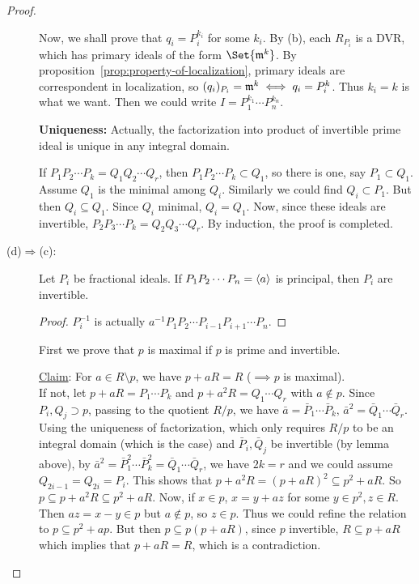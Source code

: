 \begin{theorem}
\begin{proof}
\begin{description}
        Now, we shall prove that $q_i = P_i^{k_i}$ for some $k_i$.
        By (b), each $R_{P_i}$ is a DVR, which has primary ideals
        of the form $\Set{\mf^k}$. By proposition~\ref{prop:property-of-localization},
        primary ideals are correspondent in localization,
        so $(q_i)_{P_i} = \mathfrak{m}^k \iff q_i = P_i^k$. Thus $k_i = k$
        is what we want. Then we could write $I = P_1^{k_1} \dotsm P_n^{k_n}$.

        {\bf Uniqueness:}
        Actually, the factorization into product of invertible
        prime ideal is unique in any integral domain.

        If $P_1 P_2 \dotsm P_k = Q_1 Q_2 \dotsm Q_r$,
        then $P_1 P_2 \dotsm P_k \subset Q_1$, so there is one,
        say $P_1 \subset Q_1$. Assume $Q_1$ is the minimal among $Q_i$.
        Similarly we could find $Q_i \subset P_1$.
        But then $Q_i \subseteq Q_1$. Since $Q_i$ minimal, $Q_i = Q_1$.
        Now, since these ideals are invertible,
        $P_2 P_3 \dotsm P_k = Q_2 Q_3 \dotsm Q_r$. By induction, the proof is completed.
      \item[\rm (d)$\Rightarrow$(c):]
        \begin{lemma}
          Let $P_i$ be fractional ideals. If $P_1 P_2 \dotsm P_n = \langle a\rangle$
          is principal, then $P_i$ are invertible.

          \begin{proof}
            $P_i^{-1}$ is actually $a^{-1} P_1 P_2 \dotsm P_{i-1} P_{i+1} \dotsm P_n$.
          \end{proof}
        \end{lemma}
        First we prove that $p$ is maximal if $p$ is prime and invertible.

        \underline{Claim}: For $a \in R \setminus p$, we have $p+ aR = R$
        ($\implies p$ is maximal). \\
        If not, let $p + aR = P_1 \dotsm P_k$ and $p + a^2 R = Q_1 \dotsm Q_r$
        with $a \notin p$.
        Since $P_i, Q_j \supset p$, passing to the quotient $R/p$, we have
        $\bar{a} = \bar P_1 \dotsm \bar P_k, \, \bar{a}^2 = \bar Q_1 \dotsm \bar Q_r$.
        Using the uniqueness of factorization, which only requires $R/p$
        to be an integral domain (which is the case) and $\bar P_i, \bar Q_j$
        be invertible (by lemma above),
        by $\bar{a}^2 = \bar P_1^2 \dotsm \bar P_k^2 = \bar Q_1 \dotsm \bar Q_r$,
        we have $2k = r$ and we could assume $Q_{2i-1} = Q_{2i} = P_i$.
        This shows that $p + a^2 R = (p + aR)^2 \subseteq p^2 + aR$.
        So $p \subseteq p + a^2 R \subseteq p^2 + aR$. Now, if $x \in p$,
        $x = y + az$ for some $y \in p^2, z \in R$. Then $az = x - y \in p$
        but $a \notin p$, so $z \in p$. Thus we could
        refine the relation to $p \subseteq p^2 + ap$.
        But then $p \subseteq p (p + aR)$, since $p$ invertible, $R \subseteq p + aR$
        which implies that $p + aR = R$, which is a contradiction.


\end{description}
\end{proof}
\end{theorem}
